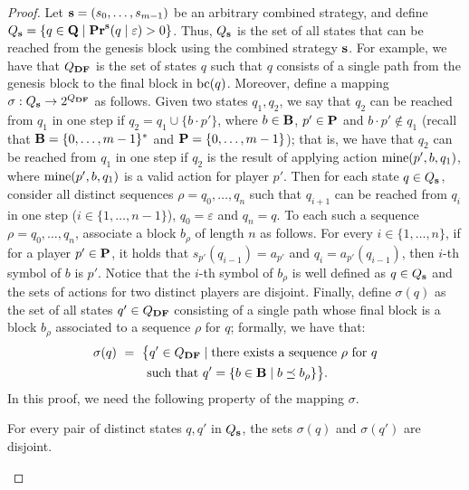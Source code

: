 \begin{proof}
Let $\mathbf{s}= (s_0, \ldots, s_{m-1})$ be an arbitrary combined strategy, and define $Q_{\mathbf{s}} = \{q \in \mathbf{Q} \mid \mathbf{Pr}^{\mathbf{s}}(q \mid \varepsilon) > 0\}$. Thus, $Q_{\mathbf{s}}$ is the set of all states that can be reached from the genesis block using the combined strategy $\mathbf{s}$. For example, we have that $Q_{\text{\rm {\bf DF}}}$ is the set of states $q$ such that $q$ consists of a single path from the genesis block to the final block in $\text{bc}(q)$.
Moreover, define a mapping $\sigma: Q_{\mathbf{s}} \rightarrow 2^{Q_{\text{\rm {\bf DF}}}}$ as follows. Given two states $q_1, q_2$, we say that $q_2$ can be reached from $q_1$ in one step if $q_2 = q_1 \cup \{ b \cdot p' \}$, where $b \in \mathbf{B}$, $p' \in \mathbf{P}$ and $b \cdot p' \not\in q_1$ (recall that $\mathbf{B} = \{0, \ldots, m-1\}^*$ and $\mathbf{P} = \{0, \ldots, m-1\}$); that is, we have that $q_2$ can be reached from $q_1$ in one step  if $q_2$ is the result of applying action $\text{\rm mine}(p', b, q_1)$, where $\text{\rm mine}(p', b, q_1)$ is a valid action for player $p'$. 
Then for each state $q \in Q_{\mathbf{s}}$, consider all distinct sequences $\rho = q_0,\dots,q_n$ such that $q_{i+1}$ can be reached from 
$q_i$ in one step ($i \in \{1, \ldots, n-1\}$), $q_0 = \varepsilon$ and $q_n = q$. To each such a sequence $\rho = q_0,\dots,q_n$, associate a block $b_\rho$ of length $n$ as follows.
For every $i \in \{1, \ldots, n\}$, if for a player $p' \in \mathbf{P}$, it holds that $s_{p'}(q_{i-1}) = a_{p'}$ and $q_{i} = a_{p'}(q_{i-1})$, then $i$-th symbol of $b$ is $p'$. Notice that the $i$-th symbol of $b_\rho$ is well defined as $q \in Q_{\mathbf{s}}$ and the sets of actions for two distinct players are disjoint.
Finally, define $\sigma(q)$ as the set of all states $q' \in Q_{\text{\rm {\bf DF}}}$ consisting of a single path whose final block is a block $b_\rho$ associated to a sequence $\rho$ for $q$; formally, we have that:
\begin{multline*}
\sigma(q) \ = \ \big\{q' \in Q_{\text{\rm {\bf DF}}} \mid \text{there exists a sequence } \rho \text{ for } q\\ \text{ such that } q' = \{ b \in \mathbf{B} \mid b \preceq b_\rho \}\big\}.
\end{multline*}
%
In this proof, we need the following property of the mapping $\sigma$.

\begin{myclaim}
\label{claim-nonempty-inter-gen}
For every pair of distinct states $q,q'$ in $Q_{\mathbf{s}}$, the sets $\sigma(q)$ and $\sigma(q')$ are disjoint. 
\end{myclaim}


\end{proof}
